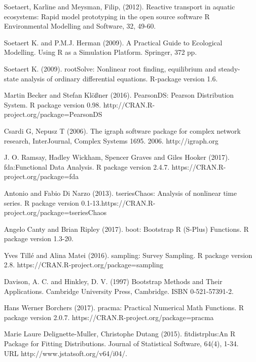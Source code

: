 \begin{thebibliography}{00}
	Soetaert, Karline and Meysman, Filip, (2012).
	\newblock Reactive transport in aquatic ecosystems: Rapid model prototyping in the open source software R
	\newblock Environmental Modelling and Software, 32, 49-60.
	
	Soetaert K. and P.M.J. Herman (2009).  
	\newblock A Practical Guide to Ecological Modelling. 
	\newblock Using R as a Simulation Platform.  Springer, 372 pp.
	
	Soetaert K. (2009).  
	\newblock rootSolve: Nonlinear root finding, equilibrium and steady-state analysis of ordinary differential equations.  
	\newblock R-package version 1.6.
	
	Martin Becker and Stefan Klößner (2016). 
	\newblock PearsonDS: Pearson Distribution System. 
	\newblock R package version 0.98. http://CRAN.R-project.org/package=PearsonDS
	
	Csardi G, Nepusz T (2006).
	\newblock The igraph software package for complex network research,
	\newblock  InterJournal, Complex Systems 1695. 2006. http://igraph.org
	
	 J. O. Ramsay, Hadley Wickham, Spencer Graves and Giles Hooker (2017). 
	\newblock fda:Functional Data Analysis. 
	\newblock R package version 2.4.7. https://CRAN.R-project.org/package=fda
	
	 Antonio and Fabio Di Narzo (2013).
	\newblock tseriesChaos: Analysis of nonlinear time series. 
	\newblock R package version 0.1-13.https://CRAN.R-project.org/package=tseriesChaos
	
	 Angelo Canty and Brian Ripley (2017). 
	\newblock boot: Bootstrap R (S-Plus) Functions. 
	\newblock R package version 1.3-20.
	
	Yves Tillé and Alina Matei (2016). 
	\newblock sampling: Survey Sampling. 
	\newblock R package version 2.8. https://CRAN.R-project.org/package=sampling
	
	 Davison, A. C. and Hinkley, D. V. (1997) 
	\newblock Bootstrap Methods and Their Applications. 
	\newblock Cambridge University Press, Cambridge. ISBN 0-521-57391-2.
	
	Hans Werner Borchers (2017). 
	\newblock pracma: Practical Numerical Math Functions. 
	\newblock R package version 2.0.7. https://CRAN.R-project.org/package=pracma
	
	Marie Laure Delignette-Muller, Christophe Dutang (2015). 
	\newblock fitdistrplus:An R Package for Fitting Distributions. 
	\newblock Journal of Statistical Software, 64(4), 1-34. URL http://www.jstatsoft.org/v64/i04/.
	

\end{thebibliography}

